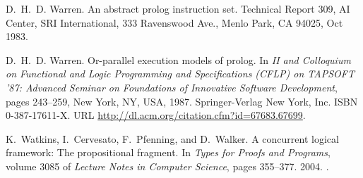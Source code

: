\documentclass{sigplanconf}
\begin{document}
\begin{thebibliography}{35}
D.~H.~D. Warren.
\newblock An abstract prolog instruction set.
\newblock Technical Report 309, AI Center, SRI International, 333 Ravenswood
  Ave., Menlo Park, CA 94025, Oct 1983.

D.~H.~D. Warren.
\newblock Or-parallel execution models of prolog.
\newblock In \emph{II and Colloquium on Functional and Logic Programming and
  Specifications (CFLP) on TAPSOFT '87: Advanced Seminar on Foundations of
  Innovative Software Development}, pages 243--259, New York, NY, USA, 1987.
  Springer-Verlag New York, Inc.
\newblock ISBN 0-387-17611-X.
\newblock URL \url{http://dl.acm.org/citation.cfm?id=67683.67699}.

K.~Watkins, I.~Cervesato, F.~Pfenning, and D.~Walker.
\newblock A concurrent logical framework: The propositional fragment.
\newblock In \emph{Types for Proofs and Programs}, volume 3085 of \emph{Lecture
  Notes in Computer Science}, pages 355--377. 2004.
\newblock {}.

\end{thebibliography}
\end{document}
